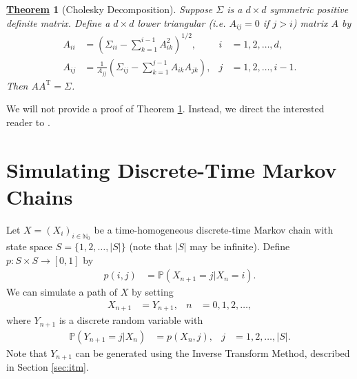 \documentclass[12pt]{book}
\numberwithin{equation}{chapter}
\theoremstyle{plain}
\newtheorem{theorem}{\underline{Theorem}}
\numberwithin{theorem}{section}
\theoremstyle{definition}
\numberwithin{exercise}{chapter}
\newcommand{\<}{\langle}
\renewcommand{\>}{\rangle}
\renewcommand{\(}{\left(}
\renewcommand{\)}{\right)}
\renewcommand{\[}{\left[}
\renewcommand{\]}{\right]}
\newcommand\Pb{\mathds{P}}
\newcommand\Nb{\mathds{N}}
\newcommand\Sig{\Sigma}
\begin{document}
\begin{theorem}[Cholesky Decomposition]
\label{thm:cholesky}
Suppose $\Sig$ is a $d \times d$ symmetric positive definite matrix.  Define a $d \times d$ lower triangular (i.e. $A_{ij}=0$ if $j>i$) matrix $A$ by
\begin{align}
A_{ii}
	&=	\( \Sigma_{ii} - \sum_{k=1}^{i-1} A_{ik}^2 \)^{1/2} , &
i
	&=	1, 2, \ldots, d , \\
A_{ij}
	&=	\frac{1}{A_{jj}} \( \Sigma_{ij} - \sum_{k=1}^{j-1} A_{ik} A_{jk} \) , &
j
	&=	1, 2, \ldots, i-1 .
\end{align}
Then $A A^\text{T} = \Sigma$.
\end{theorem}
\noindent
We will not provide a proof of Theorem \ref{thm:cholesky}.  Instead, we direct the interested reader to \cite[Chapter 2]{glasserman2013monte}.

\section{Simulating Discrete-Time Markov Chains}
Let $X = (X_i)_{i \in \Nb_0}$ be a time-homogeneous discrete-time Markov chain with state space $S = \{ 1, 2, \ldots, |S|\}$ (note that $|S|$ may be infinite).  Define $p: S \times S \to [0,1]$ by
\begin{align}
p(i,j)
	&=	\Pb( X_{n+1} = j | X_n = i ) .
\end{align}
We can simulate a path of $X$ by setting
\begin{align}
X_{n+1}
	&=	Y_{n+1} , &
n
	&=	0, 1, 2, \ldots ,
\end{align}
where $Y_{n+1}$ is a discrete random variable with
\begin{align}
\Pb( Y_{n+1} = j | X_n )
	&=	p(X_n,j) , &
j
	&=	1, 2, \ldots, |S| .
\end{align}
Note that $Y_{n+1}$ can be generated using the Inverse Transform Method, described in Section \ref{sec:itm}. 
\end{document}

